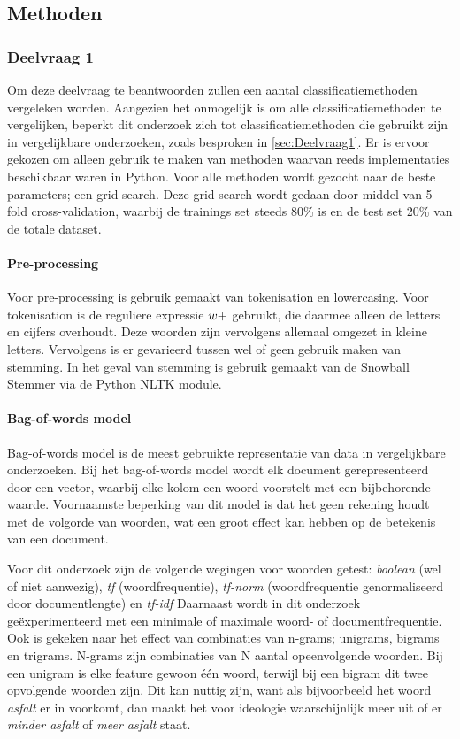 \subsection{Methoden}


\subsubsection{Deelvraag 1}
Om deze deelvraag te beantwoorden zullen een aantal classificatiemethoden vergeleken worden. Aangezien het onmogelijk is om alle classificatiemethoden te vergelijken, beperkt dit onderzoek zich tot classificatiemethoden die gebruikt zijn in vergelijkbare onderzoeken, zoals besproken in \ref{sec:Deelvraag1}. Er is ervoor gekozen om alleen gebruik te maken van methoden waarvan reeds implementaties beschikbaar waren in Python. Voor alle methoden wordt gezocht naar de beste parameters; een grid search. Deze grid search wordt gedaan door middel van 5-fold cross-validation, waarbij de trainings set steeds 80\% is en de test set 20\% van de totale dataset.

\paragraph{Pre-processing}
Voor pre-processing is gebruik gemaakt van tokenisation en lowercasing. Voor tokenisation is de reguliere expressie $\\w+$ gebruikt, die daarmee alleen de letters en cijfers overhoudt. Deze woorden zijn vervolgens allemaal omgezet in kleine letters. Vervolgens is er gevarieerd tussen wel of geen gebruik maken van stemming. In het geval van stemming is gebruik gemaakt van de Snowball Stemmer via de Python NLTK module.

\paragraph{Bag-of-words model}
Bag-of-words model is de meest gebruikte representatie van data in vergelijkbare onderzoeken. Bij het bag-of-words model wordt elk document gerepresenteerd door een vector, waarbij elke kolom een woord voorstelt met een bijbehorende waarde. Voornaamste beperking van dit model is dat het geen rekening houdt met de volgorde van woorden, wat een groot effect kan hebben op de betekenis van een document.\par
Voor dit onderzoek zijn de volgende wegingen voor woorden getest: \textit{boolean} (wel of niet aanwezig), \textit{tf} (woordfrequentie), \textit{tf-norm} (woordfrequentie genormaliseerd door documentlengte) en \textit{tf-idf}
Daarnaast wordt in dit onderzoek geëxperimenteerd met een minimale of maximale woord- of documentfrequentie. Ook is gekeken naar het effect van combinaties van n-grams; unigrams, bigrams en trigrams. N-grams zijn combinaties van N aantal opeenvolgende woorden. Bij een unigram is elke feature gewoon één woord, terwijl bij een bigram dit twee opvolgende woorden zijn. Dit kan nuttig zijn, want als bijvoorbeeld het woord \textit{asfalt} er in voorkomt, dan maakt het voor ideologie waarschijnlijk meer uit of er \textit{minder asfalt} of \textit{meer asfalt} staat.\par


